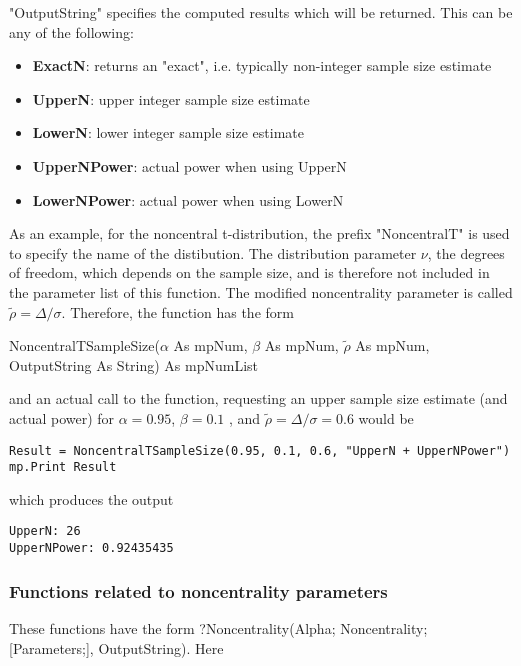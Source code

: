 "OutputString" specifies the computed results which will be returned. This can be any of the following:

\begin{itemize}
	\item \textbf{ExactN}: returns an "exact", i.e. typically non-integer sample size estimate 
	\item \textbf{UpperN}: upper integer sample size estimate
	\item \textbf{LowerN}: lower integer sample size estimate
	\item \textbf{UpperNPower}: actual power when using UpperN
	\item \textbf{LowerNPower}: actual power when using LowerN
\end{itemize}


\vspace{0.3cm}
As an example, for the noncentral  t-distribution, the prefix "NoncentralT" is used to specify the name of the distibution. The distribution parameter $\nu$, the degrees of freedom, which depends on the sample size, and is therefore not included in the parameter list of this function. The modified noncentrality parameter is called $\tilde{\rho} = \Delta/\sigma$. Therefore, the function has the form

\vspace{0.3cm}
\textsf{NoncentralTSampleSize($\alpha$ As mpNum, $\beta$ As mpNum, $\tilde{\rho}$ As mpNum, OutputString As String) As mpNumList}

\vspace{0.3cm}
and an actual call to the function, requesting an upper sample size estimate (and actual power) for $\alpha = 0.95$, $\beta=0.1$ , and $\tilde{\rho} = \Delta/\sigma = 0.6$   would be

\begin{lstlisting}
Result = NoncentralTSampleSize(0.95, 0.1, 0.6, "UpperN + UpperNPower")
mp.Print Result
\end{lstlisting}
which produces the output

\begin{verbatim}
UpperN: 26
UpperNPower: 0.92435435
\end{verbatim}



\newpage
\subsubsection{Functions related to noncentrality parameters}
\label{Functions related to noncentrality parameters}
These functions have the form \textsf{?Noncentrality(Alpha; Noncentrality; [Parameters;],  OutputString)}.
Here 

